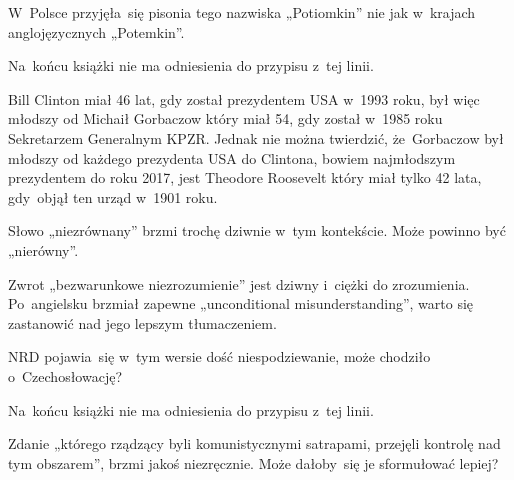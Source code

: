 \documentclass[a4paper,11pt]{article}
\numberwithin{equation}{section}
\begin{document}
\VerSpaceFour





\noindent
{} W~Polsce przyjęła~się pisonia tego nazwiska
„Potiomkin” nie jak w~krajach anglojęzycznych „Potemkin”.

\VerSpaceFour





\noindent
{} Na~końcu książki nie ma odniesienia do przypisu
z~tej linii.

\VerSpaceFour





\noindent
{} Bill Clinton miał 46 lat, gdy został prezydentem USA w~1993 roku,
był więc młodszy od Michaił Gorbaczow który miał 54, gdy został w~1985 roku
Sekretarzem Generalnym KPZR. Jednak nie można twierdzić, że~Gorbaczow był
młodszy od każdego prezydenta USA do Clintona, bowiem najmłodszym
prezydentem do roku 2017, jest Theodore Roosevelt który miał tylko 42 lata,
gdy~objął ten urząd w~1901 roku.

\VerSpaceFour





\noindent
{} Słowo „niezrównany” brzmi trochę dziwnie w~tym
kontekście. Może powinno być „nierówny”.

\VerSpaceFour





\noindent
{} Zwrot „bezwarunkowe niezrozumienie” jest dziwny
i~ciężki do
zrozumienia. Po~angielsku brzmiał zapewne „unconditional misunderstanding”,
warto się zastanowić nad jego lepszym tłumaczeniem.

\VerSpaceFour





\noindent
{} NRD pojawia~się w~tym wersie dość niespodziewanie,
może chodziło o~Czechosłowację?

\VerSpaceFour





\noindent
{} Na~końcu książki nie ma odniesienia do przypisu
z~tej linii.

\VerSpaceFour





\noindent
{} Zdanie „którego rządzący byli komunistycznymi
satrapami,
przejęli kontrolę nad tym obszarem”, brzmi jakoś niezręcznie. Może
dałoby~się je sformułować lepiej?
\end{document}
